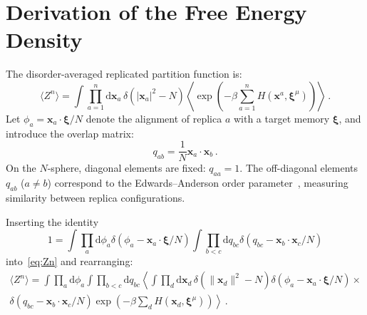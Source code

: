\documentclass{article}
\newcommand{\dd}{{\mathrm{d}}}
\theoremstyle{plain}
\theoremstyle{definition}
\theoremstyle{remark}
\begin{document}
\nocite{langley00}




\newpage
\appendix
\onecolumn

\section{Derivation of the Free Energy Density}\label{app:free_energy}

The disorder-averaged replicated partition function is:
\begin{equation}
    \langle Z^n \rangle = \int \prod_{a=1}^n \dd\bm{x}_a \, \delta(|\bm{x}_a|^2 - N) \left\langle \exp\left(-\beta \sum_{a=1}^n H(\bm{x}^a, \bm{\xi}^\mu)\right) \right\rangle\,.
    \label{eq:Zn}
\end{equation}
Let $\phi_a = \bm{x}_a \cdot \bm{\xi}/N$ denote the alignment of replica $a$ with a target memory $\bm{\xi}$, and introduce the overlap matrix:
\begin{equation}
    q_{ab} = \frac{1}{N} \bm{x}_a \cdot \bm{x}_b\,.
\end{equation}
On the $N$-sphere, diagonal elements are fixed: $q_{aa} = 1$. The off-diagonal elements $q_{ab}$ ($a \neq b$) correspond to the Edwards–Anderson order parameter~\citep{ea75}, measuring similarity between replica configurations.

Inserting the identity
\begin{equation}
1 = \int \prod_a \dd \phi_a \delta\left(\phi_a - \bm{x}_a \cdot \bm{\xi}/N\right) 
\int \prod_{b<c} \dd q_{bc} \delta\left(q_{bc} - \bm{x}_b \cdot \bm{x}_c/N\right)
\end{equation}
into~\eqref{eq:Zn} and rearranging:
\begin{multline}
\langle Z^n \rangle = \int \prod_a \dd \phi_a \int \prod_{b<c} \dd q_{bc} \left\langle \int \prod_d \dd \bm{x}_d \, \delta(\|\bm{x}_d\|^2 - N) \delta(\phi_a - \bm{x}_a \cdot \bm{\xi}/N) \right. \times \\
\left.  \delta(q_{bc} - \bm{x}_b \cdot \bm{x}_c/N) \exp\left(-\beta \sum_d H(\bm{x}_d, \bm{\xi}^\mu)\right) \right\rangle \,.
\end{multline}
\end{document}
